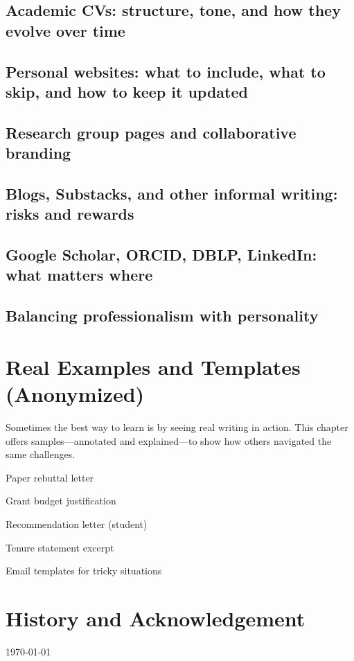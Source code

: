 \documentclass[oneside,11pt,dvipsnames]{book}
\begin{document}
\section{Academic CVs: structure, tone, and how they evolve over time}

\section{Personal websites: what to include, what to skip, and how to keep it updated}

\section{Research group pages and collaborative branding}

\section{Blogs, Substacks, and other informal writing: risks and rewards}

\section{Google Scholar, ORCID, DBLP, LinkedIn: what matters where}

\section{Balancing professionalism with personality}


\chapter{Real Examples and Templates (Anonymized)}

Sometimes the best way to learn is by seeing real writing in action. This chapter offers samples—annotated and explained—to show how others navigated the same challenges.

Paper rebuttal letter

Grant budget justification

Recommendation letter (student)

Tenure statement excerpt

Email templates for tricky situations








\chapter{History and Acknowledgement}\label{chap:ack}

\begin{center}
\today{}
\end{center}

%
%
\end{document}
